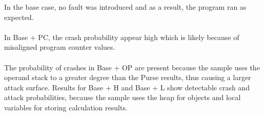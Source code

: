 In the base case, no fault was introduced and as a result, the program ran as expected.\\\\
%
In Base + PC, the crash probability appear high which is likely because of misaligned program counter values.\\\\
%
The probability of crashes in Base + OP are present because the sample uses the operand stack to a greater degree than the \jc Purse results, thus causing a larger attack surface.
%
Results for Base + H and Base + L show detectable crash and attack probabilities, because the sample uses the heap for objects and local variables for storing calculation results.